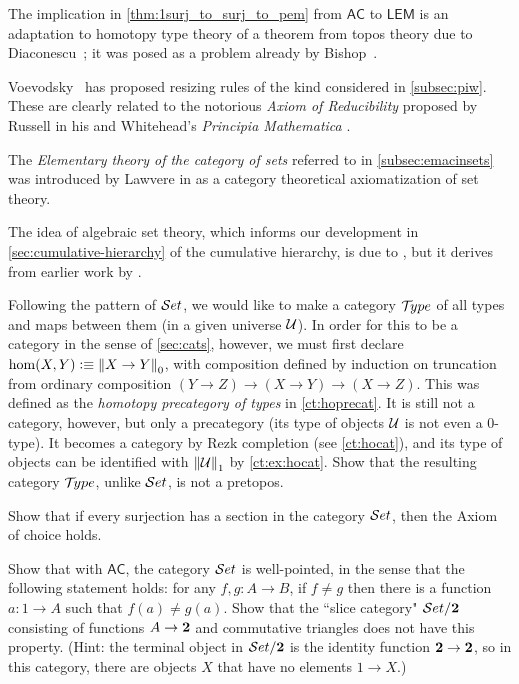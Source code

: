 The implication in \autoref{thm:1surj_to_surj_to_pem} from $\mathsf{AC}$ to $\mathsf{LEM}$ is an adaptation to homotopy type
theory of a theorem from topos theory due to Diaconescu~\cite{Diaconescu}; it was posed as a problem already by Bishop~\cite[Problem
2,p58]{Bishop1967}.

Voevodsky~\cite{Universe-poly} has proposed resizing rules of the kind considered in \autoref{subsec:piw}.  These are clearly related to the notorious \emph{Axiom of Reducibility} proposed by Russell in his and Whitehead's \emph{Principia Mathematica} \cite{WR:PM}.

The \emph{Elementary theory of the category of sets} referred to in \autoref{subsec:emacinsets} was introduced by Lawvere in
\cite{lawvere:etcs-long} as a category theoretical axiomatization of set theory.

The idea of algebraic set theory, which informs our development in \autoref{sec:cumulative-hierarchy} of the cumulative hierarchy, is due to
\cite{JoyalMoerdijk1995}, but it derives from earlier work by \cite{AczelCZF}.


\sectionExercises

\begin{ex}
Following the pattern of $\mathcal{S}et$, we would like to make a category $\mathcal{T}\!ype$ of all types and maps between them (in a given universe $\mathcal{U}$).  In order for this to be a category in the sense of \autoref{sec:cats}, however, we must first declare $\hom(X,Y) \vcentcolon\equiv \left\Vert X\to Y\right\Vert_{0}$, with composition defined by induction on truncation from ordinary composition $(Y\to Z) \to (X\to Y) \to (X\to Z)$.  This was defined as the \emph{homotopy precategory of types} in \autoref{ct:hoprecat}.  It is still not a category, however, but only a precategory (its type of objects $\mathcal{U}$ is not even a $0$-type).  It becomes a category by Rezk completion (see \autoref{ct:hocat}), and its type of objects can be identified with $\left\Vert \mathcal{U}\right\Vert_{1}$ by \autoref{ct:ex:hocat}.  Show that the resulting category $\mathcal{T}\!ype$, unlike $\mathcal{S}et$, is not a pretopos.
\end{ex}

\begin{ex}
  Show that if every surjection has a section in the category $\mathcal{S}et$, then the Axiom of choice holds.
\end{ex}

\begin{ex}
Show that with $\mathsf{AC}$, the category $\mathcal{S}et$ is well-pointed, in the sense that the following statement holds: for any $f, g : A\to B$, if $f \neq g$ then there is a function $a : 1\to A$ such that $f(a) \neq g(a)$.  Show that the ``slice category" $\mathcal{S}et/\mathbf{2}$ consisting of functions $A\to \mathbf{2}$ and commutative triangles does not have this property. (Hint: the terminal object in $\mathcal{S}et/\mathbf{2}$ is the identity function $\mathbf{2} \to \mathbf{2}$, so in this category, there are objects $X$ that have no elements $1\to X$.)
\end{ex}

